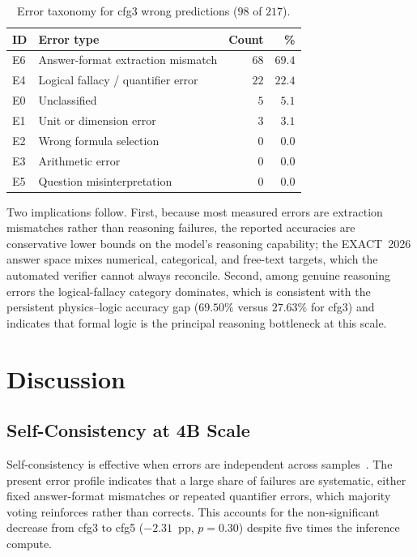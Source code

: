 \documentclass[preprint,12pt]{elsarticle}
\newcommand{\dataset}{EXACT~2026}
\begin{document}
\begin{table}[t]
\centering
\caption{Error taxonomy for cfg3 wrong predictions ($98$ of $217$).}
\label{tab:errors}
\begin{tabular}{llrr}
\toprule
ID & Error type & Count & \% \\
\midrule
E6 & Answer-format extraction mismatch   & $68$ & $69.4$ \\
E4 & Logical fallacy / quantifier error  & $22$ & $22.4$ \\
E0 & Unclassified                        & $\phantom{0}5$ & $\phantom{0}5.1$ \\
E1 & Unit or dimension error             & $\phantom{0}3$ & $\phantom{0}3.1$ \\
E2 & Wrong formula selection             & $\phantom{0}0$ & $\phantom{0}0.0$ \\
E3 & Arithmetic error                    & $\phantom{0}0$ & $\phantom{0}0.0$ \\
E5 & Question misinterpretation          & $\phantom{0}0$ & $\phantom{0}0.0$ \\
\bottomrule
\end{tabular}
\end{table}

Two implications follow. First, because most measured errors are extraction
mismatches rather than reasoning failures, the reported accuracies are
conservative lower bounds on the model's reasoning capability; the
\dataset{} answer space mixes numerical, categorical, and free-text targets,
which the automated verifier cannot always reconcile. Second, among genuine
reasoning errors the logical-fallacy category dominates, which is consistent
with the persistent physics--logic accuracy gap ($69.50\%$ versus $27.63\%$
for cfg3) and indicates that formal logic is the principal reasoning
bottleneck at this scale.

\section{Discussion}
\label{sec:discussion}

\subsection{Self-Consistency at 4B Scale}
Self-consistency is effective when errors are independent across
samples~\cite{Wang2023sc}. The present error profile indicates that a large
share of failures are systematic, either fixed answer-format mismatches or
repeated quantifier errors, which majority voting reinforces rather than
corrects. This accounts for the non-significant decrease from cfg3 to cfg5
($-2.31$~pp, $p=0.30$) despite five times the inference compute.
\end{document}
